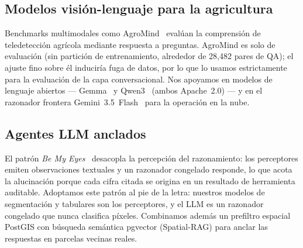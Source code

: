 \subsection{Modelos visión-lenguaje para la agricultura}
Benchmarks multimodales como AgroMind~\cite{ruan2025agromind} evalúan la
comprensión de teledetección agrícola mediante respuesta a preguntas.
AgroMind es solo de evaluación (sin partición de entrenamiento, alrededor
de 28{,}482 pares de QA); el ajuste fino sobre él induciría fuga de
datos, por lo que lo usamos estrictamente para la evaluación de la capa
conversacional. Nos apoyamos en modelos de lenguaje abiertos ---
Gemma~\cite{team2024gemma} y Qwen3~\cite{yang2025qwen3} (ambos
Apache~2.0) --- y en el razonador frontera
Gemini~3.5~Flash~\cite{google2025gemini25} para la operación en la nube.

\subsection{Agentes LLM anclados}
El patrón \emph{Be My Eyes}~\cite{huang2025bemyeyes} desacopla la
percepción del razonamiento: los perceptores emiten observaciones
textuales y un razonador congelado responde, lo que acota la
alucinación porque cada cifra citada se origina en un resultado de
herramienta auditable. Adoptamos este patrón al pie de la letra: nuestros
modelos de segmentación y tabulares son los perceptores, y el LLM es un
razonador congelado que nunca clasifica píxeles. Combinamos además un
prefiltro espacial PostGIS con búsqueda semántica pgvector (Spatial-RAG)
para anclar las respuestas en parcelas vecinas reales.

